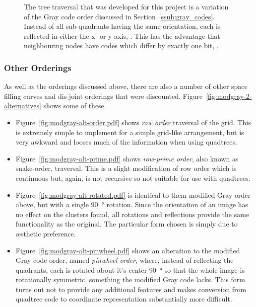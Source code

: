 \begin{figure}[tbh]
	\caption[Modified Gray Code ordering]{The tree traversal that was developed
		for this project is a variation of the Gray code order discussed in
		Section~\ref{ssub:gray_codes}.  Instead of all sub-quadrants having the
		same orientation, each is reflected in either the x- or y-axis,
		. This has the advantage that
		neighbouring nodes have codes which differ by exactly one bit,
		.}\label{fig:modgray-traversal}
\end{figure}


\subsubsection{Other Orderings}
\label{ssub:other_orderings}

As well as the orderings discussed above, there are also a number of other
space filling curves and dis-joint orderings that were discounted.
Figure~\ref{fig:modgray-2-alternatives} shows some of these.

\begin{itemize}

	\item Figure~\ref{fig:modgray-alt-order.pdf} shows \emph{row order}
		traversal of the grid. This is extremely simple to implement for a
		simple grid-like arrangement, but is very awkward and looses much of
		the information when using quadtrees.

	\item Figure~\ref{fig:modgray-alt-prime.pdf} shows \emph{row-prime order},
		also known as snake-order\cite{goodchild1983optimizing}, traversal.
		This is a slight modification of row order which is continuous but,
		again, is not recursive so not suitable for use with quadtrees.

	\item Figure~\ref{fig:modgray-alt-rotated.pdf} is identical to them
		modified Gray order above, but with a single \SI{90}{\degree} rotation.
		Since the orientation of an image has no effect on the clusters found,
		all rotations and reflections provide the same functionality as the
		original. The particular form chosen is simply due to {\ae}sthetic
		preference.

	\item Figure~\ref{fig:modgray-alt-pinwheel.pdf} shows an alteration to the
		modified Gray code order, named \emph{pinwheel order}, where, instead of
		reflecting the quadrants, each is rotated about it's center
		\SI{90}{\degree} so that the whole image is rotationally symmetric,
		something the modified Gray code lacks.  This form turns out not to
		provide any additional features and makes conversion from quadtree code
		to coordinate representation substantially more difficult.

\end{itemize}

